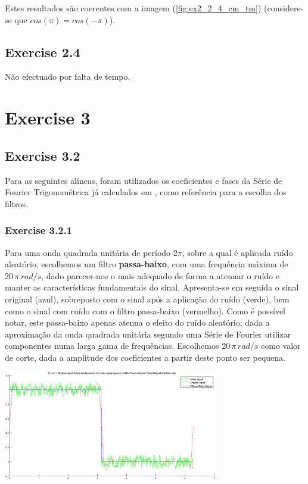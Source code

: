 \documentclass[a4paper]{article}
\begin{document}
\noindent Estes resultados são coerentes com a imagem (\ref{fig:ex2_2_4_cm_tm}) (considere-se que $cos(\pi) = cos(-\pi)$).

\subsection{Exercise 2.4}
\noindent Não efectuado por falta de tempo.

\clearpage
\section{Exercise 3}
\subsection{Exercise 3.2}
\noindent Para as seguintes alíneas, foram utilizados os coeficientes e fases da Série de Fourier Trigonométrica já calculados em \emph{}, como referência para a escolha dos filtros.

\subsubsection{Exercise 3.2.1}
\noindent Para uma onda quadrada unitária de período $2 \pi$, sobre a qual é aplicada ruído aleatório, escolhemos um filtro \textbf{passa-baixo}, com uma frequência máxima de $20 \, \pi \, rad/s$, dado parecer-nos o mais adequado de forma a atenuar o ruído e manter as características fundamentais do sinal. Apresenta-se em seguida o sinal original (azul), sobreposto com o sinal após a aplicação do ruído (verde), bem como o sinal com ruído com o filtro passa-baixo (vermelho). Como é possível notar, este passa-baixo apenas atenua o efeito do ruído aleatório, dada a aproximação da onda quadrada unitária segundo uma Série de Fourier utilizar componentes numa larga gama de frequências. Escolhemos $20 \, \pi \, rad/s$ como valor de corte, dada a amplitude dos coeficientes a partir deste ponto ser pequena.

\begin{center}
	\includegraphics[width=0.70\textwidth]{images/ex3_2_1_plot.png}
	\label{fig:ex3_2_1_plot}
\end{center}
\end{document}
